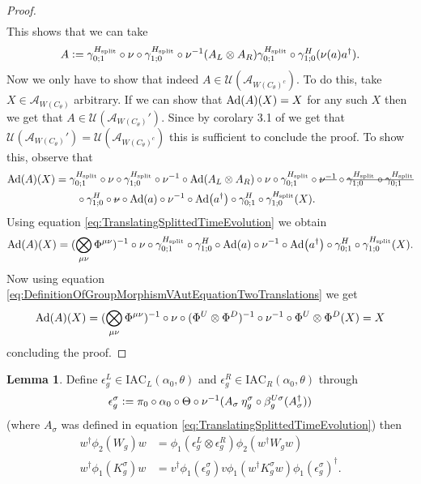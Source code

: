 \documentclass[12pt,a4paper,twoside]{article}
\newcommand{\stkout}[1]{\ifmmode\text{\sout{\ensuremath{#1}}}\else\sout{#1}\fi}
\newcommand{\IAC}{\textrm{IAC}}
\newcommand{\defeq}{\vcentcolon=}
\let\originalleft\left
\let\originalright\right
\renewcommand{\left}{\mathopen{}\mathclose\bgroup\originalleft}
\renewcommand{\right}{\aftergroup\egroup\originalright}
\newcommand{\UU}{\mathcal U}
\renewcommand{\AA}{\mathcal A}
\newcommand{\Ad}[1]{\textrm{Ad}\left(#1\right)}
\theoremstyle{definition}
\newtheorem{lemma}[theorem]{Lemma}
\numberwithin{equation}{section}
\begin{document}
\begin{proof}
\begin{align}
	\end{align}
	This shows that we can take
	\begin{equation}
		A\defeq \gamma^{H_\text{split}}_{0;1}\circ\nu\circ\gamma^{H_\text{split}}_{1;0}\circ\nu^{-1}(A_L\otimes A_R)\gamma^{H_\text{split}}_{0;1}\circ\gamma^H_{1;0}(\nu(a)a^\dagger).
	\end{equation}
	Now we only have to show that indeed $A\in\UU(\AA_{W(C_\theta)^c})$. To do this, take $X\in\AA_{W(C_\theta)}$ arbitrary. If we can show that $\Ad{A}(X)=X$ for any such $X$ then we get that $A\in\UU(\AA_{W(C_\theta)}')$. Since by corolary 3.1 of \cite{NaScWe_2013} we get that $\UU(\AA_{W(C_\theta)}')=\UU(\AA_{W(C_\theta)^c})$ this is sufficient to conclude the proof. To show this, observe that
	\begin{align}
		\Ad{A}(X)&=\gamma^{H_\text{split}}_{0;1}\circ\nu\circ\gamma^{H_\text{split}}_{1;0}\circ\nu^{-1}\circ\Ad{A_L\otimes A_R}\circ\nu\circ\gamma^{H_\text{split}}_{0;1}\circ\stkout{\nu^{-1}}\circ\stkout{\gamma^{H_\text{split}}_{1;0}\circ\gamma^{H_\text{split}}_{0;1}}\\
		&\nonumber
		\qquad\circ\gamma^H_{1;0}\circ\stkout{\nu}\circ\Ad{a}\circ\nu^{-1}\circ\Ad{a^\dagger}\circ\gamma^H_{0;1}\circ\gamma^{H_\text{split}}_{1;0}(X).
	\end{align}
	Using equation \eqref{eq:TranslatingSplittedTimeEvolution} we obtain
	\begin{equation}
		\Ad{A}(X)=(\bigotimes_{\mu\nu}\Phi^{\mu\nu})^{-1}\circ\nu\circ\gamma^{H_\text{split}}_{0;1}\circ\gamma^H_{1;0}\circ\Ad{a}\circ\nu^{-1}\circ\Ad{a^\dagger}\circ\gamma^H_{0;1}\circ\gamma^{H_\text{split}}_{1;0}(X).
	\end{equation}
	Now using equation \eqref{eq:DefinitionOfGroupMorphismVAutEquationTwoTranslations} we get
	\begin{equation}
		\Ad{A}(X)=(\bigotimes_{\mu\nu}\Phi^{\mu\nu})^{-1}\circ\nu\circ(\Phi^U\otimes\Phi^D)^{-1}\circ\nu^{-1}\circ\Phi^U\otimes\Phi^D(X)=X
	\end{equation}
	concluding the proof.
\end{proof}
\begin{lemma}
	Define $\epsilon^L_g\in\IAC_L(\alpha_0,\theta)$ and $\epsilon^R_g\in\IAC_R(\alpha_0,\theta)$ through
	\begin{align}
		\epsilon_g^\sigma\defeq \pi_0\circ\alpha_0\circ\Theta\circ\nu^{-1}(A_\sigma\:\eta_g^\sigma\circ\beta_{g}^{U\sigma}(A_\sigma^\dagger))
	\end{align}
	(where $A_\sigma$ was defined in equation \ref{eq:TranslatingSplittedTimeEvolution}) then
	\begin{align}
		w^\dagger \phi_2(W_g)w &= \phi_1(\epsilon_g^L\otimes\epsilon_g^R)\phi_2(w^\dagger W_g w)\\
		\label{eq:TransformationOfKUnderEpsilon}
		w^\dagger \phi_1(K_g^\sigma)w&=v^\dagger\phi_1(\epsilon_g^\sigma)v\phi_1(w^\dagger K_g^\sigma w)\phi_1(\epsilon_g^\sigma)^\dagger.
	\end{align}
\end{lemma}
\end{document}
